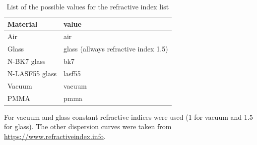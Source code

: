 \documentclass[a4paper,html,11pt,openany]{book}
\begin{document}
 \vspace{1em}
 \begin{center}
 \begin{table}
 \begin{tabular}[H]{l|l}
 Material & value \\
 \hline 
 Air & air \\
 Glass & glass (allways refractive index 1.5) \\
 N-BK7 glass & bk7 \\
 N-LASF55 glass & lasf55 \\
 Vacuum & vacuum \\ 
 PMMA & pmma \\
 \end{tabular}  
 \caption{List of the possible values for the refractive index list}
 \label{tab:refractiveIndexList}
\end{table}
 \end{center}
 For vacuum and glass constant refractive indices were used (1 for vacuum and 1.5 for glass). The other dispersion curves were taken from \url{https://www.refractiveindex.info}. 
\end{document}
